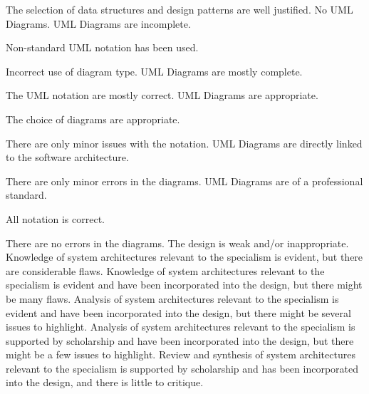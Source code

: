 \documentclass{../../fal_assignment}
\begin{document}
\begin{markingrubric}
	\par The selection of data structures and design patterns are well justified.
%
	\grade\fail No UML Diagrams.
	\grade UML Diagrams are incomplete.
	\par Non-standard UML notation has been used.
	\par Incorrect use of diagram type.
	\grade UML Diagrams are mostly complete.
	\par The UML notation are mostly correct.
	\grade UML Diagrams are appropriate.
	\par The choice of diagrams are appropriate.
	\par There are only minor issues with the notation.
	\grade UML Diagrams are directly linked to the software architecture.
	\par There are only minor errors in the diagrams.
	\grade UML Diagrams are of a professional standard.
	\par All notation is correct.
	\par There are no errors in the diagrams.
%
	\grade\fail The design is weak and/or inappropriate.
	\grade Knowledge of system architectures relevant to the specialism is evident, but there are considerable flaws.
	\grade Knowledge of system architectures relevant to the specialism is evident and have been incorporated into the design, but there might be many flaws.
	\grade Analysis of system architectures relevant to the specialism is evident and have been incorporated into the design, but there might be several issues to highlight.
	\grade Analysis of system architectures relevant to the specialism is supported by scholarship and have been incorporated into the design, but there might be a few issues to highlight.
	\grade Review and synthesis of system architectures relevant to the specialism is supported by scholarship and has been incorporated into the design, and there is little to critique.
%
\end{markingrubric}
\end{document}
